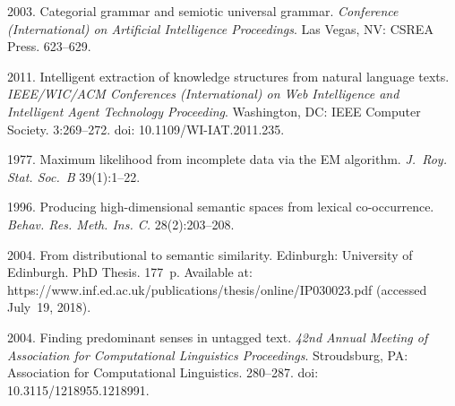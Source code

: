 









  \begin{multicols}{2}

\renewcommand{\bibname}{\protect\rmfamily References}

{\small\frenchspacing
 {%
 \begin{thebibliography}{99}
     
  2003. Categorial grammar and semiotic universal grammar.  
\textit{Conference (International) on Artificial Intelligence Proceedings}. 
Las Vegas, NV: CSREA Press. 623--629.

2011. Intelligent extraction of knowledge structures from natural language texts. 
\textit{IEEE/WIC/ACM Conferences (International) on Web Intelligence and 
Intelligent Agent Technology Proceeding}. 
Washington, DC: IEEE Computer Society. 3:269--272. doi: 10.1109/WI-IAT.2011.235.

 1977. Maximum likelihood 
from incomplete data via the EM algorithm. 
\textit{J.~Roy. Stat. Soc.~B} 39(1):1--22.

 1996. Producing high-dimensional semantic spaces 
from lexical co-occurrence. \textit{Behav. Res. Meth. Ins. C.}  
28(2):203--208.

 2004. From distributional to semantic similarity. Edinburgh: 
University of Edinburgh. PhD Thesis. 177~p.  Available at: 
{\sf https://www.inf.ed.ac.uk/\linebreak publications/thesis/online/IP030023.pdf} 
(accessed July~19, 2018).

 2004. 
Finding predominant senses in untagged text. 
\textit{42nd Annual Meeting of Association for Computational Linguistics Proceedings}. 
Stroudsburg, PA: Association for 
Computational Linguistics. 280--287. doi: 10.3115/1218955.1218991.


\end{thebibliography}}}
\end{multicols}
